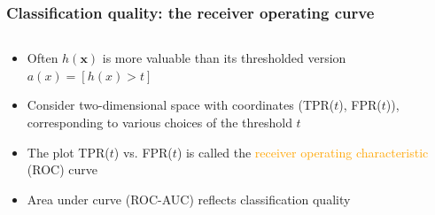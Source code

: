 \documentclass[usenames,dvipsnames,aspectratio=169]{beamer}
\begin{document}
\begin{frame}
\frametitle{Classification quality: the receiver operating curve}

\begin{columns}
\begin{column}{0.6\textwidth}
    \begin{itemize}
        \item Often $h(\mathbf{x})$ is more
        valuable than its thresholded
        version $a(x) = [h(x) > t]$

        \pause
        \item Consider two-dimensional
        space with coordinates (TPR($t$), FPR($t$)),
        corresponding to various choices of the threshold $t$

        \pause 
        \item The plot TPR($t$) vs. FPR($t$) is called the
        \textcolor{orange}{receiver operating
        characteristic} (ROC) curve

        \pause
        \item Area under curve (ROC-AUC) 
        reflects classification quality
    \end{itemize}
\end{column}

\end{columns}

\end{frame}
\end{document}
